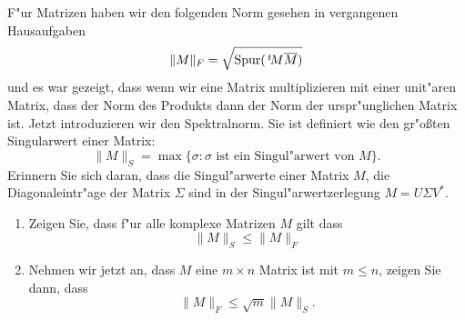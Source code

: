 \documentclass[a4,11pt]{article}
\begin{document}
\newpage

\begin{aufgabe}

F"ur Matrizen haben wir den folgenden Norm gesehen in vergangenen Hausaufgaben
\[
\| M \|_F = \sqrt{\text{Spur}(\,^t\!M \overline{M})}
\]
und es war gezeigt, dass wenn wir eine Matrix multiplizieren mit einer unit"aren Matrix, dass der Norm des Produkts dann der Norm der urspr"unglichen Matrix ist. Jetzt introduzieren wir den Spektralnorm. Sie ist definiert wie den gr"oßten Singularwert einer Matrix:
\[
\| M \|_S = \max \{ \sigma : \sigma \text{ ist ein Singul"arwert von } M \}.
\]
Erinnern Sie sich daran, dass die Singul"arwerte einer Matrix $M$, die Diagonaleintr"age der Matrix $\Sigma$ sind in der Singul"arwertzerlegung $M = U\Sigma V^*$.

\begin{enumerate}
\item
Zeigen Sie, dass f"ur alle komplexe Matrizen $M$ gilt dass
\[
\| M \|_S \leq \| M \|_F 
\]
\item
Nehmen wir jetzt an, dass $M$ eine $m \times n$ Matrix ist mit $m \leq n$, zeigen Sie dann, dass
\[
\| M \|_F \leq \sqrt{m} \| M \|_S.
\]
\end{enumerate}

\end{aufgabe}
\end{document}
